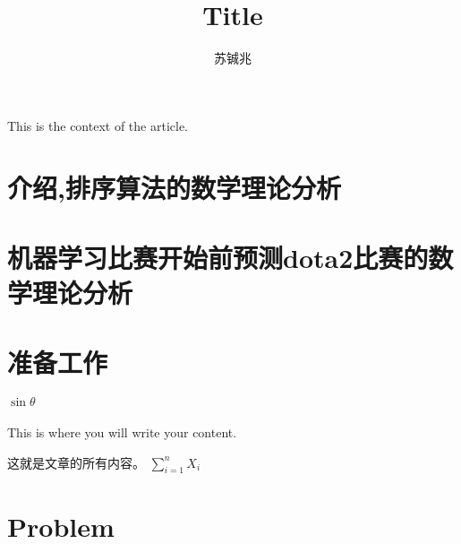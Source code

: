 \documentclass[UTF8]{ctexart}
\begin{document}
This is the context of the article.
  
\title{Title}
\author{苏铖兆}
\maketitle{}
\section{介绍,排序算法的数学理论分析}
\section{机器学习比赛开始前预测dota2比赛的数学理论分析}
\section{准备工作}

$\sin\theta$\\\\
This is where you will write your content.

这就是文章的所有内容。
$\sum\limits_{i=1}^{n}{X_i}$
\section{Problem}
\end{document}
